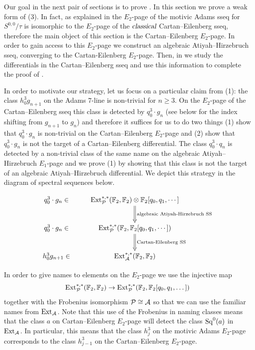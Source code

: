 




Our goal in the next pair of sections is to prove .
In this section we prove a weak form of (3).
In fact, as explained in  the $E_2$-page of the motivic Adams sseq for $S^{0,0}/\tau$ is isomorphic to the $E_2$-page of the $\textsl{classical}$ Cartan--Eilenberg sseq, therefore the main object of this section is the Cartan--Eilenberg $E_2$-page.
In order to gain access to this $E_2$-page we construct an algebraic Atiyah--Hirzebruch sseq, converging to the Cartan-Eilenberg $E_2$-page.
Then, in  we study the differentials in the Cartan--Eilenberg sseq and use this information to complete the proof of .

In order to motivate our strategy,  let us focus on a particular claim from (1):
the class $h_0^3g_{n+1}$ on the Adams $7$-line is non-trivial for $n \geq 3$.
On the $E_2$-page of the Cartan--Eilenberg sseq this class is detected by $q_0^3 \cdot g_n$ (see  below for the index shifting from $g_{n+1}$ to $g_n$) and therefore it suffices for us to do two things (1) show that $q_0^3 \cdot g_n$ is non-trivial on the Cartan--Eilenberg $E_2$-page and (2) show that $q_0^3 \cdot g_n$ is not the target of a Cartan--Eilenberg differential.
The class $q_0^3 \cdot q_n$ is detected by a non-trivial class of the same name on the algebraic Atiyah--Hirzebruch $E_1$-page and we prove (1) by showing that this class is not the target of an algebraic Atiyah--Hirzebruch differential. We depict this strategy in the diagram of spectral sequences below.

$$\xymatrix{
q_0^3 \cdot g_n \in & \Ext_{\P}^{*,*}(\F_2, \F_2) \otimes \F_2[q_0, q_1, \cdots] \ar@{=>}[d]^{\textup{algebraic Atiyah-Hirzebruch SS}} \\
q_0^3 \cdot g_n \in & \Ext^{*,*}_{\P}(\F_2, \F_2[q_0, q_1, \cdots]) \ar@{=>}[d]^{\textup{Cartan-Eilenberg SS}} \\
h_0^3 g_{n+1} \in & \Ext_{\A}^{*,*}(\F_2, \F_2)
}$$



\begin{ntn} \label{ntn:frob names}
  In order to give names to elements on the $E_2$-page we use the injective map
  \[ \operatorname{\mathrm{Ext}}_{\mathcal{P}}^{*,*}(\operatorname{\mathbb{F}}_2, \operatorname{\mathbb{F}}_2) \to \operatorname{\mathrm{Ext}}_{\mathcal{P}}^{*,*}(\operatorname{\mathbb{F}}_2, \operatorname{\mathbb{F}}_2[q_0,q_1,\dots]) \]
  together with the Frobenius isomorphism $\mathcal{P} \cong \operatorname{\mathcal{A}}$ so that we can use the familiar names from $\operatorname{\mathrm{Ext}}_{\operatorname{\mathcal{A}}}$.
  Note that this use of the Frobenius in naming classes means that the class $a$ on Cartan--Eilenberg $E_2$-page will detect the class $\operatorname{\mathrm{Sq}}^0(a)$ in $\operatorname{\mathrm{Ext}}_{\operatorname{\mathcal{A}}}$.
  In particular, this means that the class $h_j^3$ on the motivic Adams $E_2$-page corresponds to the class $h_{j-1}^3$ on the Cartan--Eilenberg $E_2$-page.
\end{ntn}

